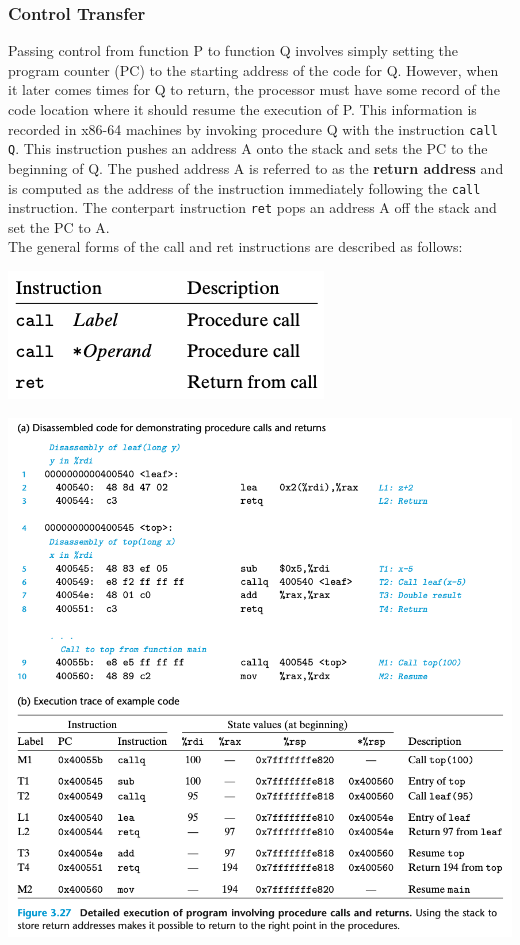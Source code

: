 \documentclass[11pt]{article}
\begin{document}
\subsubsection{Control Transfer}
\label{sec:org0a4a4d4}
Passing control from function P to function Q involves simply setting the program counter (PC) to the starting address of the code for Q. However, when it later comes times for Q to return, the processor must have some record of the code location where it should resume the execution of P. This information is recorded in x86-64 machines by invoking procedure Q with the instruction \texttt{call Q}. This instruction pushes an address A onto the stack and sets the PC to the beginning of Q. The pushed address A is referred to as the \textbf{return address} and is computed as the address of the instruction immediately following the \texttt{call} instruction. The conterpart instruction \texttt{ret} pops an address A off the stack and set the PC to A.\\

The general forms of the call and ret instructions are described as follows:\\

\begin{center}
\includegraphics[width=.9\linewidth]{pics/general-forms-of-the-call-and-ret.png}
\end{center}


\begin{center}
\includegraphics[width=.9\linewidth]{pics/detailed-execution-of-program-involving-procedure-calls-and-returns.png}
\end{center}
\end{document}
